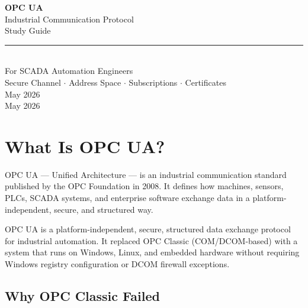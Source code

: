 \documentclass[12pt,twoside,openright]{memoir}
\begin{document}
\begin{titlingpage}
  \pagecolor{opcuanavy}
  \color{white}
  \vspace*{2cm}
  \begin{center}
    {\fontsize{48}{56}\selectfont\bfseries OPC UA}\\[0.5em]
    {\Large Industrial Communication Protocol}\\[0.3em]
    {\large Study Guide}\\[3cm]
    \textcolor{opcuacyan}{\rule{0.6\textwidth}{2pt}}\\[1.5cm]
    {\large For SCADA Automation Engineers}\\[0.5em]
    {\normalsize Secure Channel $\cdot$ Address Space $\cdot$ Subscriptions $\cdot$ Certificates}\\[2cm]
    {\small\textcolor{opcuacyan}{May 2026}}\\[2cm]
    {\small\textcolor{opcuacyan}{May 2026}}
  \end{center}
\end{titlingpage}
\nopagecolor

\clearpage

\tableofcontents
\clearpage

\chapter{What Is OPC UA?}

OPC UA --- Unified Architecture --- is an industrial communication standard published by the OPC Foundation in 2008.
It defines how machines, sensors, PLCs, SCADA systems, and enterprise software exchange data in a platform-independent,
secure, and structured way.

\begin{keyconcept}
OPC UA is a platform-independent, secure, structured data exchange protocol for industrial automation. It replaced
OPC Classic (COM/DCOM-based) with a system that runs on Windows, Linux, and embedded hardware without requiring
Windows registry configuration or DCOM firewall exceptions.
\end{keyconcept}

\section{Why OPC Classic Failed}
\end{document}
